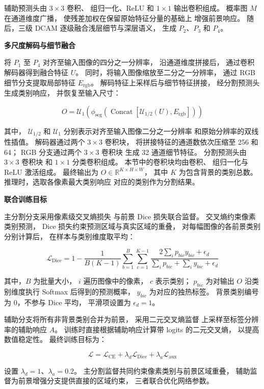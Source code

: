 辅助预测头由 \(3\times3\) 卷积、
组归一化、ReLU 和 \(1\times1\) 输出卷积组成。
概率图 \(M\) 在通道维度广播，
使残差加权在保留原始特征分量的基础上
增强前景响应。
随后，三级 DCAM 逐级融合浅层细节与深层语义，
生成 \(P_2\)、\(P_3\) 和 \(P_4\)。

\noindent\textbf{多尺度解码与细节融合}\par

将 \(P_1\) 至 \(P_4\)
对齐至输入图像的四分之一分辨率，
沿通道维度拼接后，
通过卷积解码器得到融合特征 \(U\)。
同时，将输入图像缩放至二分之一分辨率，
通过 RGB 细节分支提取局部特征
\(E_{\mathrm{rgb}}\)。
解码特征上采样后与细节特征拼接，
经分割预测头生成类别响应，
并恢复至输入尺寸：

\begin{equation}
O=\mathcal{U}_1\left(
\phi_{\mathrm{seg}}\left(
\operatorname{Concat}[
\mathcal{U}_{1/2}(U),E_{\mathrm{rgb}}
]\right)\right)
\label{eq:prediction-output}
\end{equation}

其中，
\(\mathcal{U}_{1/2}\) 和 \(\mathcal{U}_1\)
分别表示对齐至输入图像二分之一分辨率
和原始分辨率的双线性插值。
解码器通过两个 \(3\times3\) 卷积块，
将拼接特征的通道数依次压缩至 256 和 64；
RGB 分支通过两个 \(3\times3\) 卷积块
生成 32 通道细节特征。
分割预测头由 \(3\times3\) 卷积块
和 \(1\times1\) 分类卷积组成。
本节中的卷积块均由卷积、
组归一化与 ReLU 激活组成。
最终输出为
\(O\in\mathbb{R}^{K\times H\times W}\)，
其中 \(K\) 为包含背景的类别总数。
推理时，选取各像素最大类别响应
对应的类别作为分割结果。

\noindent\textbf{联合训练目标}\par

主分割分支采用像素级交叉熵损失
与前景 Dice 损失联合监督。
交叉熵约束像素类别预测，
Dice 损失约束预测区域与真实区域的重叠，
对每幅图像的各前景类别分别计算后，
在样本与类别维度取平均：

\begin{equation}
\mathcal{L}_{\mathrm{Dice}}
=1-\frac{1}{B(K-1)}
\sum_{b=1}^{B}\sum_{c=1}^{K-1}
\frac{2\sum_i p_{bic}y_{bic}+\epsilon_d}
{\sum_i p_{bic}+\sum_i y_{bic}+\epsilon_d}
\label{eq:loss-dice}
\end{equation}

其中，\(B\) 为批量大小，
\(i\) 遍历图像中的像素，
\(c\) 表示类别；
\(p_{bic}\) 为对输出 \(O\)
沿类别维度执行 Softmax 后得到的预测概率，
\(y_{bic}\) 为对应的独热标签。
背景类别编号为 0，不参与 Dice 平均，
平滑项设置为 \(\epsilon_d=1\)。

辅助分支将所有非背景类别合并为前景，
采用二元交叉熵监督
上采样至标签分辨率的辅助响应 \(A\)。
训练时直接根据辅助响应计算带 logits 的二元交叉熵，
以提高数值稳定性。
最终训练目标为：

\begin{equation}
\mathcal{L}
=\mathcal{L}_{\mathrm{CE}}
+\lambda_d\mathcal{L}_{\mathrm{Dice}}
+\lambda_a\mathcal{L}_{\mathrm{aux}}
\label{eq:loss-total}
\end{equation}

设置 \(\lambda_d=1\)、\(\lambda_a=0.2\)。
主分割监督共同约束像素类别与前景区域重叠，
辅助监督为前景增强分支提供直接的区域约束，
三者联合优化网络参数。
\par
\endgroup